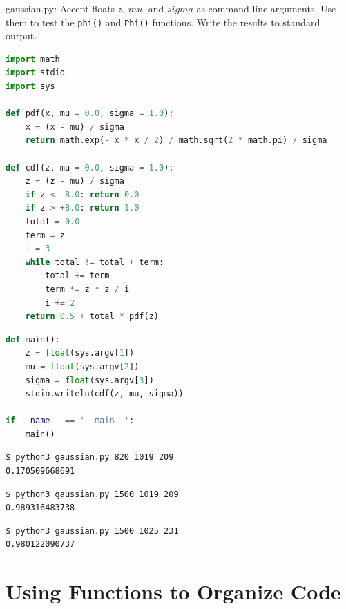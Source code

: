 \documentclass[8pt,a4paper,compress]{beamer}
\begin{document}
\begin{frame}[fragile]
\pause

\begin{framed}
\tiny gaussian.py: Accept floats $z$, $mu$, and $sigma$ as command-line arguments. Use them to test the \lstinline{phi()} and \lstinline{Phi()} functions. Write the results to standard output.
\end{framed}

\begin{lstlisting}[language=Python]
import math
import stdio
import sys

def pdf(x, mu = 0.0, sigma = 1.0):
    x = (x - mu) / sigma
    return math.exp(- x * x / 2) / math.sqrt(2 * math.pi) / sigma

def cdf(z, mu = 0.0, sigma = 1.0):
    z = (z - mu) / sigma
    if z < -8.0: return 0.0
    if z > +8.0: return 1.0
    total = 0.0
    term = z
    i = 3
    while total != total + term:
        total += term
        term *= z * z / i
        i += 2
    return 0.5 + total * pdf(z)
\end{lstlisting}
\end{frame}

\begin{frame}[fragile]
\pause

\begin{lstlisting}[language=Python]
def main():
    z = float(sys.argv[1])
    mu = float(sys.argv[2])
    sigma = float(sys.argv[3])
    stdio.writeln(cdf(z, mu, sigma))

if __name__ == '__main__':
    main()
\end{lstlisting}

\pause

\begin{lstlisting}[language={}]
$ python3 gaussian.py 820 1019 209
0.170509668691
\end{lstlisting}

\pause

\begin{lstlisting}[language={}]
$ python3 gaussian.py 1500 1019 209
0.989316483738
\end{lstlisting}

\pause

\begin{lstlisting}[language={}]
$ python3 gaussian.py 1500 1025 231
0.980122090737
\end{lstlisting}
\end{frame}

\section{Using Functions to Organize Code}
\end{document}
